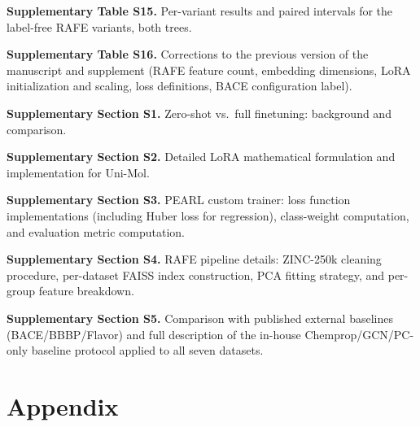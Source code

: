 \documentclass[pdflatex,sn-mathphys-num]{sn-jnl}%
\begin{document}
\noindent \textbf{Supplementary Table S15.} Per-variant results and paired intervals for the label-free RAFE variants, both trees.

\noindent \textbf{Supplementary Table S16.} Corrections to the previous version of the manuscript and supplement (RAFE feature count, embedding dimensions, LoRA initialization and scaling, loss definitions, BACE configuration label).

\noindent\textbf{Supplementary Section S1.} Zero-shot vs.\ full finetuning: background and comparison.

\noindent\textbf{Supplementary Section S2.} Detailed LoRA mathematical formulation and implementation for Uni-Mol.

\noindent\textbf{Supplementary Section S3.} PEARL custom trainer: loss function implementations (including Huber loss for regression), class-weight computation, and evaluation metric computation.

\noindent\textbf{Supplementary Section S4.} RAFE pipeline details: ZINC-250k cleaning procedure, per-dataset FAISS index construction, PCA fitting strategy, and per-group feature breakdown.

\noindent\textbf{Supplementary Section S5.} Comparison with published external baselines (BACE/BBBP/Flavor) and full description of the in-house Chemprop/GCN/PC-only baseline protocol applied to all seven datasets.

\section*{Appendix}

\end{document}
